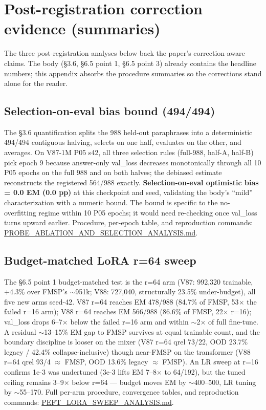 \documentclass[11pt]{article}
\begin{document}
\appendix
\section{Post-registration correction evidence (summaries)}

The three post-registration analyses below back the paper's correction-aware claims. The body (\S3.6, \S6.5 point 1, \S6.5 point 3) already contains the headline numbers; this appendix absorbs the procedure summaries so the corrections stand alone for the reader.

\subsection{Selection-on-eval bias bound (494/494)}

The \S3.6 quantification splits the 988 held-out paraphrases into a deterministic 494/494 contiguous halving, selects on one half, evaluates on the other, and averages. On V87-1M P05 s42, all three selection rules (full-988, half-A, half-B) pick epoch 9 because answer-only val\_loss decreases monotonically through all 10 P05 epochs on the full 988 and on both halves; the debiased estimate reconstructs the registered 564/988 exactly. \textbf{Selection-on-eval optimistic bias = 0.0 EM (0.0 pp)} at this checkpoint and seed, validating the body's ``mild'' characterization with a numeric bound. The bound is specific to the no-overfitting regime within 10 P05 epochs; it would need re-checking once val\_loss turns upward earlier. Procedure, per-epoch table, and reproduction commands: \href{https://github.com/llaa33219/MicroMixer-4/blob/4bb630413dfa58ef3141291e121ab8c006d03235/PROBE_ABLATION_AND_SELECTION_ANALYSIS.md}{PROBE\_ABLATION\_AND\_SELECTION\_ANALYSIS.md}.

\subsection{Budget-matched LoRA r=64 sweep}

The \S6.5 point 1 budget-matched test is the r=64 arm (V87: 992{,}320 trainable, +4.3\% over FMSP's $\sim$951k; V88: 727{,}040, structurally 23.5\% under-budget), all five new arms seed-42. V87 r=64 reaches EM 478/988 (84.7\% of FMSP, 53$\times$ the failed r=16 arm); V88 r=64 reaches EM 566/988 (86.6\% of FMSP, 22$\times$ r=16); val\_loss drops 6--7$\times$ below the failed r=16 arm and within $\sim$2$\times$ of full fine-tune. A residual $\sim$13--15\% EM gap to FMSP survives at equal trainable count, and the boundary discipline is looser on the mixer (V87 r=64 qrel 73/22, OOD 23.7\% legacy / 42.4\% collapse-inclusive) though near-FMSP on the transformer (V88 r=64 qrel 93/4 $\approx$ FMSP, OOD 13.6\% legacy $\approx$ FMSP). An LR sweep at r=16 confirms 1e-3 was undertuned (3e-3 lifts EM 7--8$\times$ to 64/192), but the tuned ceiling remains 3--9$\times$ below r=64 --- budget moves EM by $\sim$400--500, LR tuning by $\sim$55--170. Full per-arm procedure, convergence tables, and reproduction commands: \href{https://github.com/llaa33219/MicroMixer-4/blob/4bb630413dfa58ef3141291e121ab8c006d03235/PEFT_LORA_SWEEP_ANALYSIS.md}{PEFT\_LORA\_SWEEP\_ANALYSIS.md}.
\end{document}
